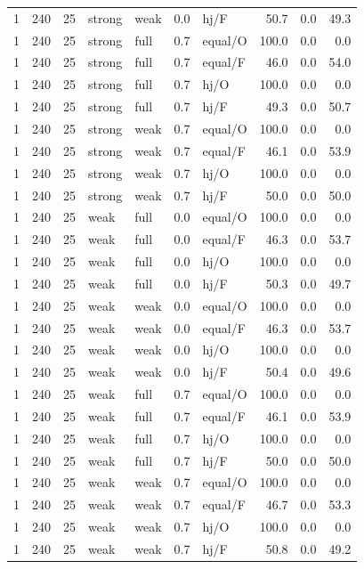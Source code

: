 {\begin{longtable}{@{}rrrllllrrr@{}}
1 & 240 & 25 & strong & weak & 0.0 & hj/F & 50.7 & 0.0 & 49.3\\
1 & 240 & 25 & strong & full & 0.7 & equal/O & 100.0 & 0.0 & 0.0\\
1 & 240 & 25 & strong & full & 0.7 & equal/F & 46.0 & 0.0 & 54.0\\
1 & 240 & 25 & strong & full & 0.7 & hj/O & 100.0 & 0.0 & 0.0\\
1 & 240 & 25 & strong & full & 0.7 & hj/F & 49.3 & 0.0 & 50.7\\
1 & 240 & 25 & strong & weak & 0.7 & equal/O & 100.0 & 0.0 & 0.0\\
1 & 240 & 25 & strong & weak & 0.7 & equal/F & 46.1 & 0.0 & 53.9\\
1 & 240 & 25 & strong & weak & 0.7 & hj/O & 100.0 & 0.0 & 0.0\\
1 & 240 & 25 & strong & weak & 0.7 & hj/F & 50.0 & 0.0 & 50.0\\
1 & 240 & 25 & weak & full & 0.0 & equal/O & 100.0 & 0.0 & 0.0\\
1 & 240 & 25 & weak & full & 0.0 & equal/F & 46.3 & 0.0 & 53.7\\
1 & 240 & 25 & weak & full & 0.0 & hj/O & 100.0 & 0.0 & 0.0\\
1 & 240 & 25 & weak & full & 0.0 & hj/F & 50.3 & 0.0 & 49.7\\
1 & 240 & 25 & weak & weak & 0.0 & equal/O & 100.0 & 0.0 & 0.0\\
1 & 240 & 25 & weak & weak & 0.0 & equal/F & 46.3 & 0.0 & 53.7\\
1 & 240 & 25 & weak & weak & 0.0 & hj/O & 100.0 & 0.0 & 0.0\\
1 & 240 & 25 & weak & weak & 0.0 & hj/F & 50.4 & 0.0 & 49.6\\
1 & 240 & 25 & weak & full & 0.7 & equal/O & 100.0 & 0.0 & 0.0\\
1 & 240 & 25 & weak & full & 0.7 & equal/F & 46.1 & 0.0 & 53.9\\
1 & 240 & 25 & weak & full & 0.7 & hj/O & 100.0 & 0.0 & 0.0\\
1 & 240 & 25 & weak & full & 0.7 & hj/F & 50.0 & 0.0 & 50.0\\
1 & 240 & 25 & weak & weak & 0.7 & equal/O & 100.0 & 0.0 & 0.0\\
1 & 240 & 25 & weak & weak & 0.7 & equal/F & 46.7 & 0.0 & 53.3\\
1 & 240 & 25 & weak & weak & 0.7 & hj/O & 100.0 & 0.0 & 0.0\\
1 & 240 & 25 & weak & weak & 0.7 & hj/F & 50.8 & 0.0 & 49.2\\

\end{longtable}}
